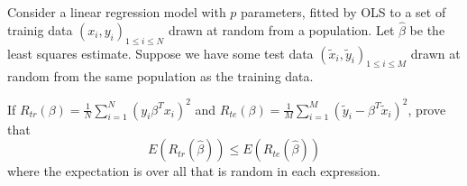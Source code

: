 \begin{exer}
    Consider a linear regression model with $p$ parameters, fitted by OLS to a set of trainig data $(x_i, y_i)_{1 \leq i \leq N}$ drawn at random from a population.  Let $\hat \beta$ be the least squares estimate.  Suppose we have some test data $(\tilde x_i, \tilde y_i)_{1 \leq i \leq M}$ drawn at random from the same population as the training data.
    
    If $R_{tr}(\beta) = \frac{1}{N} \sum_{i=1}^N \left(y_i \beta^T x_i \right)^2$ and $R_{te}(\beta) = \frac{1}{M} \sum_{i=1}^M \left( \tilde y_i - \beta^T \tilde x_i \right)^2$, prove that \[
        E(R_{tr}(\hat \beta)) \leq E(R_{te}(\hat \beta))
    \] where the expectation is over all that is random in each expression.
\end{exer}